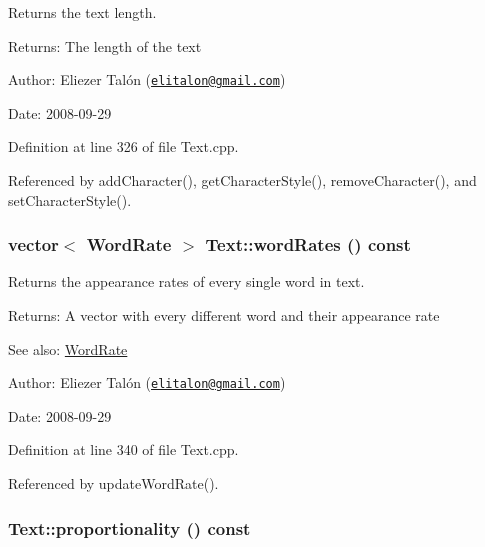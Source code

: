 Returns the text length. 

\begin{Desc}
\item[Returns:]The length of the text\end{Desc}
\begin{Desc}
\item[Author:]Eliezer Talón (\href{mailto:elitalon@gmail.com}{\tt elitalon@gmail.com}) \end{Desc}
\begin{Desc}
\item[Date:]2008-09-29 \end{Desc}


Definition at line 326 of file Text.cpp.

Referenced by addCharacter(), getCharacterStyle(), removeCharacter(), and setCharacterStyle().\hypertarget{class_text_1c69ff1b2a6b1bfbf0b44fc4a185de3d}{
\subsubsection[wordRates]{\setlength{\rightskip}{0pt plus 5cm}vector$<$ {\bf WordRate} $>$ Text::wordRates () const}}
\label{class_text_1c69ff1b2a6b1bfbf0b44fc4a185de3d}


Returns the appearance rates of every single word in text. 

\begin{Desc}
\item[Returns:]A vector with every different word and their appearance rate\end{Desc}
\begin{Desc}
\item[See also:]\hyperlink{_word_rate_8h_e8f43926daba5798edbb3cb94ad07ff7}{WordRate}\end{Desc}
\begin{Desc}
\item[Author:]Eliezer Talón (\href{mailto:elitalon@gmail.com}{\tt elitalon@gmail.com}) \end{Desc}
\begin{Desc}
\item[Date:]2008-09-29 \end{Desc}


Definition at line 340 of file Text.cpp.

Referenced by updateWordRate().\hypertarget{class_text_28df8a28b99fc925f6a9597a81769f62}{
\subsubsection[proportionality]{ Text::proportionality () const}}
\label{class_text_28df8a28b99fc925f6a9597a81769f62}


